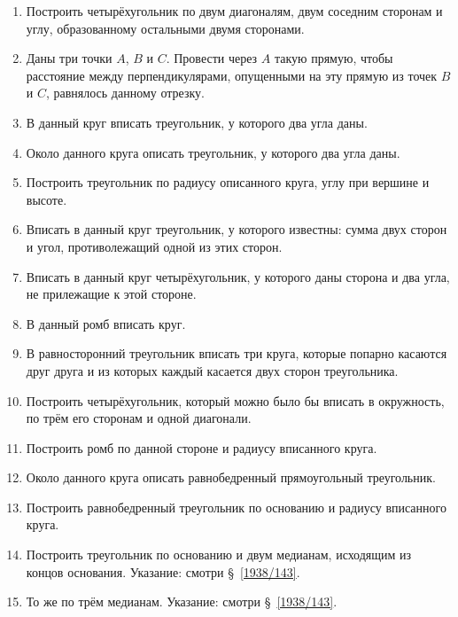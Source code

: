 \documentclass[twoside]{book}
\begin{document}
\begin{enumerate}[resume]
 \item
Построить четырёхугольник по двум диагоналям, двум соседним сторонам и углу, образованному остальными двумя сторонами.

 \item
Даны три точки $A$, $B$ и $C$.
Провести через $A$ такую прямую, чтобы расстояние между перпендикулярами, опущенными на эту прямую из точек $B$ и $C$, равнялось данному отрезку.

 \item
В данный круг вписать треугольник, у которого два угла даны.

 \item
Около данного круга описать треугольник, у которого два угла даны.

 \item
Построить треугольник по радиусу описанного круга, углу при вершине и высоте.

 \item
Вписать в данный круг треугольник, у которого известны:
сумма двух сторон и угол, противолежащий одной из этих сторон.

 \item
Вписать в данный круг четырёхугольник, у которого даны сторона и два угла, не прилежащие к этой стороне.

 \item
В данный ромб вписать круг.

 \item
В равносторонний треугольник вписать три круга, которые попарно касаются друг друга и из которых каждый касается двух сторон треугольника.

 \item
Построить четырёхугольник, который можно было бы вписать в окружность, по трём его сторонам и одной диагонали.

 \item
Построить ромб по данной стороне и радиусу вписанного круга.

 \item
Около данного круга описать равнобедренный прямоугольный треугольник.

 \item
Построить равнобедренный треугольник по основанию и радиусу вписанного круга.

 \item
Построить треугольник по основанию и двум медианам, исходящим из концов основания.
Указание: смотри §~\ref{1938/143}.

 \item
То же по трём медианам.
Указание: смотри §~\ref{1938/143}.


\end{enumerate}
\end{document}
